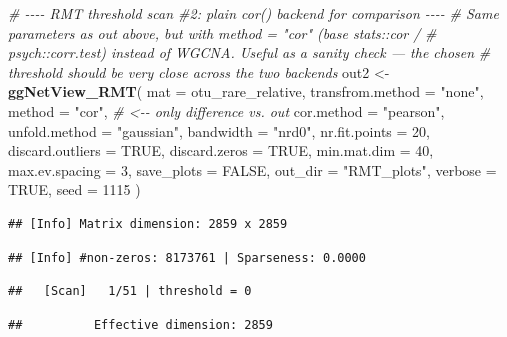 \documentclass[
]{book}
\newenvironment{Shaded}{\begin{snugshade}}{\end{snugshade}}
\newcommand{\AttributeTok}[1]{\textcolor[rgb]{0.13,0.29,0.53}{#1}}
\newcommand{\CommentTok}[1]{\textcolor[rgb]{0.56,0.35,0.01}{\textit{#1}}}
\newcommand{\ConstantTok}[1]{\textcolor[rgb]{0.56,0.35,0.01}{#1}}
\newcommand{\DecValTok}[1]{\textcolor[rgb]{0.00,0.00,0.81}{#1}}
\newcommand{\FunctionTok}[1]{\textcolor[rgb]{0.13,0.29,0.53}{\textbf{#1}}}
\newcommand{\NormalTok}[1]{#1}
\newcommand{\OtherTok}[1]{\textcolor[rgb]{0.56,0.35,0.01}{#1}}
\newcommand{\StringTok}[1]{\textcolor[rgb]{0.31,0.60,0.02}{#1}}
\begin{document}
\begin{Shaded}
\begin{Highlighting}[]
\CommentTok{\# {-}{-}{-}{-} RMT threshold scan \#2: plain \textasciigrave{}cor()\textasciigrave{} backend for comparison {-}{-}{-}{-}}
\CommentTok{\# Same parameters as \textasciigrave{}out\textasciigrave{} above, but with \textasciigrave{}method = "cor"\textasciigrave{} (base stats::cor /}
\CommentTok{\# psych::corr.test) instead of WGCNA. Useful as a sanity check — the chosen}
\CommentTok{\# threshold should be very close across the two backends}
\NormalTok{out2 }\OtherTok{\textless{}{-}} \FunctionTok{ggNetView\_RMT}\NormalTok{(}
  \AttributeTok{mat              =}\NormalTok{ otu\_rare\_relative,}
  \AttributeTok{transfrom.method =} \StringTok{"none"}\NormalTok{,}
  \AttributeTok{method           =} \StringTok{"cor"}\NormalTok{,             }\CommentTok{\# \textless{}{-}{-} only difference vs. \textasciigrave{}out\textasciigrave{}}
  \AttributeTok{cor.method       =} \StringTok{"pearson"}\NormalTok{,}
  \AttributeTok{unfold.method    =} \StringTok{"gaussian"}\NormalTok{,}
  \AttributeTok{bandwidth        =} \StringTok{"nrd0"}\NormalTok{,}
  \AttributeTok{nr.fit.points    =} \DecValTok{20}\NormalTok{,}
  \AttributeTok{discard.outliers =} \ConstantTok{TRUE}\NormalTok{,}
  \AttributeTok{discard.zeros    =} \ConstantTok{TRUE}\NormalTok{,}
  \AttributeTok{min.mat.dim      =} \DecValTok{40}\NormalTok{,}
  \AttributeTok{max.ev.spacing   =} \DecValTok{3}\NormalTok{,}
  \AttributeTok{save\_plots       =} \ConstantTok{FALSE}\NormalTok{,}
  \AttributeTok{out\_dir          =} \StringTok{"RMT\_plots"}\NormalTok{,}
  \AttributeTok{verbose          =} \ConstantTok{TRUE}\NormalTok{,}
  \AttributeTok{seed             =} \DecValTok{1115}
\NormalTok{)}
\end{Highlighting}
\end{Shaded}

\begin{verbatim}
## [Info] Matrix dimension: 2859 x 2859
\end{verbatim}

\begin{verbatim}
## [Info] #non-zeros: 8173761 | Sparseness: 0.0000
\end{verbatim}

\begin{verbatim}
##   [Scan]   1/51 | threshold = 0
\end{verbatim}

\begin{verbatim}
##          Effective dimension: 2859
\end{verbatim}
\end{document}

